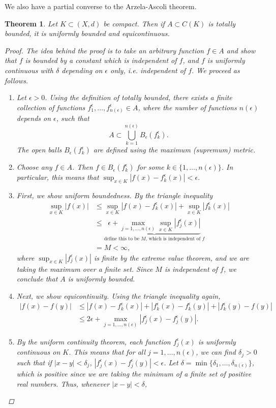 \documentclass[12pt]{amsart}         %
\newtheorem{theorem}{Theorem}[section]
\theoremstyle{remark}
\begin{document}
We also have a partial converse to the Arzela-Ascoli theorem.
\begin{theorem} Let $K \subset (X, d)$ be compact. Then if $A \subset C(K)$ is totally bounded, it is uniformly bounded and equicontinuous.
\begin{proof}The idea behind the proof is to take an arbitrary function $f \in A$ and show that $f$ is bounded by a constant which is independent of $f$, and $f$ is uniformly continuous with $\delta$ depending on $\epsilon$ only, i.e. independent of $f$. We proceed as follows.
\begin{enumerate}
\item Let $\epsilon > 0$. Using the definition of totally bounded, there exists a finite collection of functions $f_1^{\epsilon}, \dots, f_{n(\epsilon)}^{\epsilon} \in A$, where the number of functions $n(\epsilon)$ depends on $\epsilon$, such that 
\[
A \subset \bigcup_{k=1}^{n(\epsilon)} B_{\epsilon}(f_k^{\epsilon}).
\]
The open balls $B_{\epsilon}(f_k^{\epsilon})$ are defined using the maximum (supremum) metric.
\item Choose any $f \in A$. Then $f \in B_{\epsilon} (f_k^\epsilon)$ for some $k \in \{1, \dots, n(\epsilon)\}$. In particular, this means that $\sup_{x \in K}|f(x) - f_k^\epsilon(x)| < \epsilon$.
\item First, we show uniform boundedness. By the triangle inequality
\begin{align*}
\sup_{x \in K}|f(x)| &\leq \sup_{x \in K}|f(x) - f_k^\epsilon(x)| +  \sup_{x \in K}|f_k^\epsilon(x)| \\
&\leq \underbrace{ \epsilon + \max_{j = 1, \dots, n(\epsilon)} \sup_{x \in K}|f_j^\epsilon(x)| }_{\text{define this to be $M$, which is independent of $f$}} \\
&= M < \infty,
\end{align*}
where $\sup_{x \in K}|f_j^\epsilon(x)|$ is finite by the extreme value theorem, and we are taking the maximum over a finite set. Since $M$ is independent of $f$, we conclude that $A$ is uniformly bounded.
\item Next, we show equicontinuity. Using the triangle inequality again,
\begin{align*}
|f(x) - f(y)| &\leq |f(x) - f_k^\epsilon(x)| + |f_k^\epsilon(x) - f_k^\epsilon(y)| + |f_k^\epsilon(y) - f(y)| \\
&\leq 2 \epsilon + \max_{j = 1, \dots, n(\epsilon)}|f_j^\epsilon(x) - f_j^\epsilon(y)|.
\end{align*}
\item By the uniform continuity theorem, each function $f_j^\epsilon(x)$ is uniformly continuous on $K$. This means that for all $j = 1, \dots, n(\epsilon)$, we can find $\delta_j > 0$ such that if $|x - y|<\delta_j$, $|f_j^\epsilon(x) - f_j^\epsilon(y)| < \epsilon$. Let $\delta = \min\{ \delta_1, \dots, \delta_{n(\epsilon)} \}$, which is positive since we are taking the minimum of a finite set of positive real numbers. Thus, whenever $|x - y| < \delta$,

\end{enumerate}
\end{proof}
\end{theorem}
\end{document}
